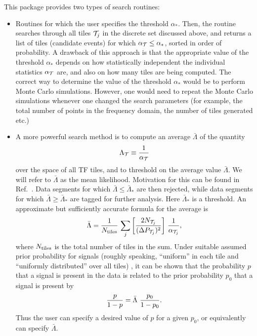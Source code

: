 \documentclass{article}
\begin{document}
This package provides two types of search routines:
\begin{itemize}
\item Routines for which the user specifies the threshold $\alpha_*$.
Then, the routine searches through all tiles ${\cal T}_j$ in the
discrete set discussed above, and returns a list of tiles (candidate
events) for which $\alpha_{\cal T} \le \alpha_*$, sorted in order of
probability.  A drawback of this
approach is that the appropriate value of the threshold $\alpha_*$
depends on how 
statistically independent the individual statistics $\alpha_{\cal T}$
are, and also on how many tiles are being computed.  The correct way
to determine the value of the threshold $\alpha_*$ would be to perform
Monte Carlo simulations.  However, one would need to repeat the Monte
Carlo simulations whenever one changed the search parameters (for
example, the total number of points in the frequency domain, the
number of tiles generated etc.)

\item A more powerful search method is to compute an average ${\bar
\Lambda}$ of the quantity 
\begin{equation}
\Lambda_{\cal T} \equiv {1 \over \alpha_{\cal T}}
\end{equation}
over the space of all TF tiles, and to threshold on the average value
${\bar \Lambda}$.  We will refer to ${\bar \Lambda}$ as the mean likelihood.
Motivation for this can be found in Ref.\ \cite{abcf:2000}.
Data segments for which ${\bar \Lambda} \le {\bar
\Lambda}_*$ are then rejected, while data segments for which
${\bar \Lambda} \ge {\bar \Lambda}_*$ are tagged for further
analysis.  Here ${\bar \Lambda}_*$ is a threshold.  An approximate but
sufficiently accurate formula for the average is \cite{abcf:2000}
\begin{equation}
{\bar \Lambda} = {1 \over N_{\rm tiles}} \, \sum_j \left[{2 N_{{\cal
T}_j} \over (\Delta P_{{\cal T}_j})^2 } \right] \, {1 \over
\alpha_{{\cal T}_j}},
\label{meanlikelihood}
\end{equation}
where $N_{\rm tiles}$ is the total number of tiles in the sum.  Under
suitable assumed prior probability for signals (roughly speaking,
``uniform'' in each tile and ``uniformly distributed'' over all tiles)  
, it can be shown that the probability $p$ that a signal is present in
the data is related to the prior probability $p_0$ that a signal is
present by \cite{abcf:2000}
\begin{equation}
{p \over 1 - p} = {\bar \Lambda} \ {p_0 \over 1 - p_0}.
\label{ff1}
\end{equation}
Thus the user can specify a desired value of $p$ for a given $p_0$, or
equivalently can specify ${\bar \Lambda}$.  

\end{itemize}
\end{document}
